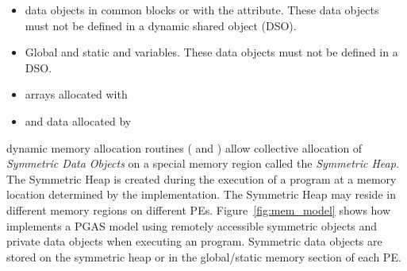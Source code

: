 \begin{itemize}
\item
  \begin{deprecate}
    \Fortran data objects in common blocks or with the  attribute.
    These data objects must not be defined in a dynamic shared object (DSO).
  \end{deprecate}
\item Global and static \Cstd and \Cpp variables. These data objects must
  not  be defined in a DSO.
\item
  \begin{deprecate}
    \Fortran arrays allocated with 
  \end{deprecate}
\item \Cstd and \Cpp data allocated by 
\end{itemize}       

\openshmem dynamic memory allocation routines ( and
) allow collective allocation of \emph{Symmetric Data
Objects} on a special memory region called the \emph{Symmetric Heap}. The
Symmetric Heap is created during the execution of a program at a memory location
determined by the implementation. The Symmetric Heap may reside in different
memory regions on different \acp{PE}. Figure~\ref{fig:mem_model} shows how
\openshmem implements a \ac{PGAS} model using remotely accessible symmetric
objects and private data objects when executing an \openshmem program.
Symmetric data objects are stored on the symmetric heap or in the global/static
memory section of each \ac{PE}. 
